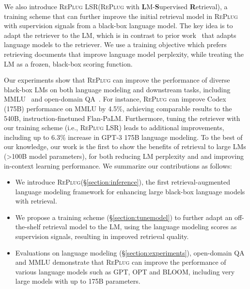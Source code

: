 \documentclass[nohyperref]{article}
\newcommand{\model}{\textsc{RePlug}\xspace}
\newcommand{\tunemodel}{\textsc{RePlug LSR}\xspace}
\theoremstyle{plain}
\theoremstyle{definition}
\theoremstyle{remark}
\begin{document}
 


 We also introduce \tunemodel (\model with \textbf{L}M-\textbf{S}upervised \textbf{R}etrieval), a training scheme that can further improve the initial retrieval model in \model with supervision signals from a black-box language model. 
 The key idea is to adapt the retriever to the LM, which is in contrast to prior work~\cite{borgeaud2022improving} that adapts language models to the retriever. 
We use a training objective which prefers retrieving documents that improve language model perplexity, while treating the LM as a frozen, black-box scoring function. 




















Our experiments show that \model can improve the performance of diverse black-box LMs on both language modeling 
and downstream tasks, including MMLU~\cite{hendrycks2021measuring} and open-domain QA~\cite{kwiatkowski-etal-2019-natural, joshi-etal-2017-triviaqa}. 
For instance, \model can improve Codex (175B) performance on MMLU by 4.5\%, achieving comparable results to the 540B, instruction-finetuned Flan-PaLM.
Furthermore, tuning the retriever with our training scheme (i.e., \tunemodel) leads to additional improvements, including up to 6.3\% increase in GPT-3 175B language modeling.
To the best of our knowledge, our work is the first to show the benefits of retrieval to large LMs (>100B model parameters), for both reducing LM perplexity and and improving in-context learning performance. We summarize our contributions as follows:
\begin{itemize}
\item We introduce \model (\S \ref{section:inference}), the first retrieval-augmented language modeling framework for enhancing large black-box language models with retrieval. 
\item We propose a training scheme (\S \ref{section:tunemodel}) to further adapt an off-the-shelf retrieval model to the LM, using the language modeling scores as supervision signals, resulting in improved retrieval quality.

\item Evaluations on language modeling (\S \ref{section:experiments}), open-domain QA and MMLU demonstrate that \model can improve the performance of various language models such as GPT, OPT and BLOOM, including very large models with up to 175B parameters. 

\end{itemize}
\end{document}
